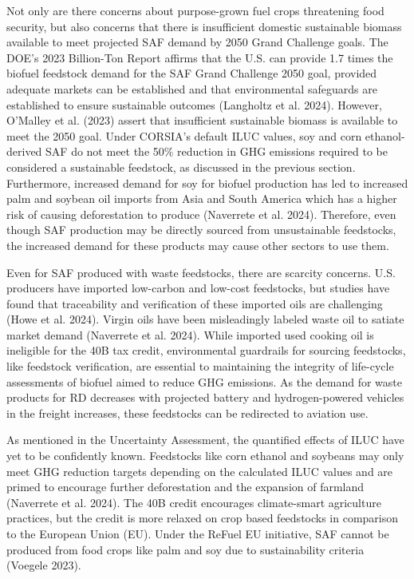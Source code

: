 \documentclass[12pt]{article}
\begin{document}
Not only are there concerns about purpose-grown fuel crops threatening food security, but also concerns that there is insufficient domestic sustainable biomass available to meet projected SAF demand by 2050 Grand Challenge goals.  The DOE’s 2023 Billion-Ton Report affirms that the U.S. can provide 1.7 times the biofuel feedstock demand for the SAF Grand Challenge 2050 goal, provided adequate markets can be established and that environmental safeguards are established to ensure sustainable outcomes (Langholtz et al. 2024). However, O’Malley et al. (2023) assert that insufficient sustainable biomass is available to meet the 2050 goal. Under CORSIA’s default ILUC values, soy and corn ethanol-derived SAF do not meet the 50\% reduction in GHG emissions required to be considered a sustainable feedstock, as discussed in the previous section. Furthermore, increased demand for soy for biofuel production has led to increased palm and soybean oil imports from Asia and South America which has a higher risk of causing deforestation to produce (Naverrete et al. 2024). Therefore, even though SAF production may be directly sourced from unsustainable feedstocks, the increased demand for these products may cause other sectors to use them. 

Even for SAF produced with waste feedstocks, there are scarcity concerns. U.S. producers have imported low-carbon and low-cost feedstocks, but studies have found that traceability and verification of these imported oils are challenging  (Howe et al. 2024). Virgin oils have been misleadingly labeled waste oil to satiate market demand (Naverrete et al. 2024). While imported used cooking oil is ineligible for the 40B tax credit, environmental guardrails for sourcing feedstocks, like feedstock verification, are essential to maintaining the integrity of life-cycle assessments of biofuel aimed to reduce GHG emissions. As the demand for waste products for RD decreases with projected battery and hydrogen-powered vehicles in the freight increases, these feedstocks can be redirected to aviation use. 

As mentioned in the Uncertainty Assessment, the quantified effects of ILUC have yet to be confidently known. Feedstocks like corn ethanol and soybeans may only meet GHG reduction targets depending on the calculated ILUC values and are primed to encourage further deforestation and the expansion of farmland (Naverrete et al. 2024).  The 40B credit encourages climate-smart agriculture practices, but the credit is more relaxed on crop based feedstocks in comparison to the European Union (EU). Under the ReFuel EU initiative, SAF cannot be produced from food crops like palm and soy due to sustainability criteria (Voegele 2023). 
\end{document}
